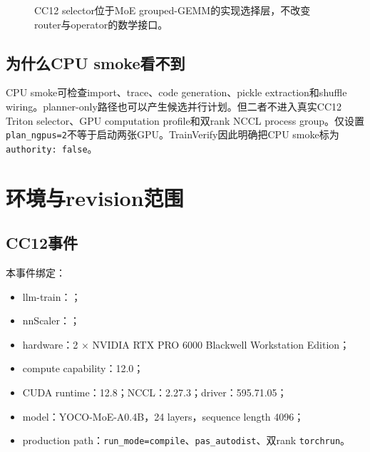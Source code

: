\documentclass[10.5pt,a4paper]{ctexart}
\begin{document}
\begin{figure}[h]
\centering
{}
\caption{CC12 selector位于MoE grouped-GEMM的实现选择层，不改变router与operator的数学接口。}
\end{figure}

\subsection{为什么CPU smoke看不到}

CPU smoke可检查import、trace、code generation、pickle extraction和shuffle wiring。planner-only路径也可以产生候选并行计划。但二者不进入真实CC12 Triton selector、GPU computation profile和双rank NCCL process group。仅设置\texttt{plan\_ngpus=2}不等于启动两张GPU。TrainVerify因此明确把CPU smoke标为\texttt{authority: false}。

\section{环境与revision范围}

\subsection{CC12事件}

本事件绑定：
\begin{itemize}
  \item llm-train：；
  \item nnScaler：；
  \item hardware：2 $\times$ NVIDIA RTX PRO 6000 Blackwell Workstation Edition；
  \item compute capability：12.0；
  \item CUDA runtime：12.8；NCCL：2.27.3；driver：595.71.05；
  \item model：YOCO-MoE-A0.4B，24 layers，sequence length 4096；
  \item production path：\texttt{run\_mode=compile}、\texttt{pas\_autodist}、双rank \texttt{torchrun}。
\end{itemize}
\end{document}
